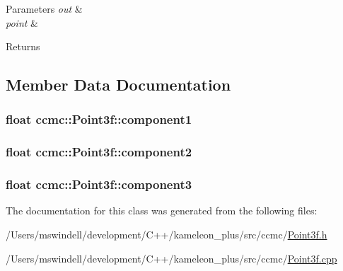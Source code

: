 \begin{DoxyParams}{Parameters}
{\em out} & \\
\hline
{\em point} & \\
\hline
\end{DoxyParams}
\begin{DoxyReturn}{Returns}

\end{DoxyReturn}


\subsection{Member Data Documentation}
\hypertarget{classccmc_1_1_point3f_a3e9b0696019ec1577083dc8d2918ea46}{
\subsubsection[{component1}]{\setlength{\rightskip}{0pt plus 5cm}float ccmc\-::\-Point3f\-::component1}}\label{classccmc_1_1_point3f_a3e9b0696019ec1577083dc8d2918ea46}
\hypertarget{classccmc_1_1_point3f_adc52014c3135cbf699d7785e901e18a3}{
\subsubsection[{component2}]{\setlength{\rightskip}{0pt plus 5cm}float ccmc\-::\-Point3f\-::component2}}\label{classccmc_1_1_point3f_adc52014c3135cbf699d7785e901e18a3}
\hypertarget{classccmc_1_1_point3f_a9f6adb1d63a8d54913c30e1b62b118fd}{
\subsubsection[{component3}]{\setlength{\rightskip}{0pt plus 5cm}float ccmc\-::\-Point3f\-::component3}}\label{classccmc_1_1_point3f_a9f6adb1d63a8d54913c30e1b62b118fd}


The documentation for this class was generated from the following files\-:\begin{DoxyCompactItemize}
\item 
/\-Users/mswindell/development/\-C++/kameleon\-\_\-plus/src/ccmc/\hyperlink{_point3f_8h}{Point3f.\-h}\item 
/\-Users/mswindell/development/\-C++/kameleon\-\_\-plus/src/ccmc/\hyperlink{_point3f_8cpp}{Point3f.\-cpp}\end{DoxyCompactItemize}
